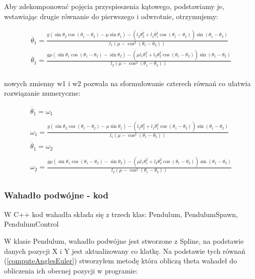 \documentclass[a4paper,12pt,reqno]{article}
\begin{document}
Aby zdekomponować pojęcia przyspieszenia kątowego, podstawiamy je, wstawiając drugie równanie do pierwszego i odwrotnie, otrzymujemy: 

\begin{equation}
\begin{split} 
\ddot{\theta_1}=\frac{g(\sin\theta_2\cos(\theta_1-\theta_2)-\mu\sin\theta_1)
-(l_2\dot{\theta_2^2}+l_1\dot{\theta_1^2}\cos(\theta_1-\theta_2))\sin(\theta_1-\theta_2)}{l_1(\mu-\cos^2(\theta_1-\theta_2))}
\\
\ddot{\theta_1}=\frac{g\mu(\sin\theta_1\cos(\theta_1-\theta_2)-\sin\theta_2)
-(\mu l_1\dot{\theta_1^2}+l_2\dot{\theta_2^2}\cos(\theta_1-\theta_2))\sin(\theta_1-\theta_2)}
{l_2(\mu-\cos^2(\theta_1-\theta_2))}
\\
\end{split}
\end{equation}


 nowych zmienny w1 i w2 pozwala na sformułowanie czterech równań co ułatwia rozwiązanie numeryczne:
 
 
\begin{equation}
\begin{split} 
\dot{\theta_1}=\omega_1\\\\
\omega_1=\frac{g(\sin\theta_2\cos(\theta_1-\theta_2)-\mu\sin\theta_1)
-(l_2\dot{\theta_2^2}+l_1\dot{\theta_1^2}\cos(\theta_1-\theta_2))\sin(\theta_1-\theta_2)}{l_1(\mu-\cos^2(\theta_1-\theta_2))}
\\
\dot{\theta_1}=\omega_2\\\\
\omega_2=\frac{g\mu(\sin\theta_1\cos(\theta_1-\theta_2)-\sin\theta_2)
-(\mu l_1\dot{\theta_1^2}+l_2\dot{\theta_2^2}\cos(\theta_1-\theta_2))\sin(\theta_1-\theta_2)}
{l_2(\mu-\cos^2(\theta_1-\theta_2))}
\\
\end{split}
\label{computeAnglesEuler}
\end{equation}


\subsubsection{Wahadło podwójne - kod}


W C++ kod wahadła składa się z trzech klas: Pendulum, PendulumSpawn, PendulumControl

W klasie Pendulum, wahadło podwójne jest stworzone z Spline, na podstawie danych pozycji X i Y jest aktualizowany co klatkę. Na podstawie tych równań (\ref{computeAnglesEuler}) stworzyłem metodę która obliczą theta wahadeł do obliczenia ich obecnej pozycji w programie:
\end{document}
